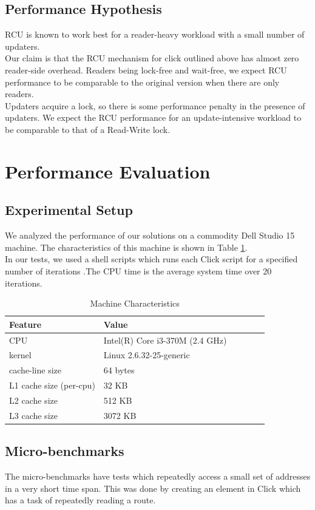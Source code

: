 \documentclass{article}
\begin{document}
\subsection{Performance Hypothesis}
RCU is known to work best for a reader-heavy workload with a small number of updaters.
\\Our claim is that the RCU mechanism for click outlined above has almost zero reader-side overhead. Readers being lock-free and wait-free, we expect RCU performance to be comparable to the original version when there are only readers.
\\Updaters acquire a lock, so there is some performance penalty in the presence of updaters. We expect the RCU performance for an update-intensive workload to be comparable to that of a Read-Write lock.
\section{Performance Evaluation}
\subsection{Experimental Setup}
We analyzed the performance of our solutions on a commodity Dell Studio 15 machine. The characteristics of this machine is shown in Table \ref{tbl:machine}.
\\In our tests, we used a shell scripts which runs each Click script for a specified number of iterations .The CPU time is the average system time over 20 iterations.
\begin{table}
\begin{center}
\begin{tabular}{|l|l|l|l|l|l|}
\hline Feature & Value\\
\hline CPU & Intel(R) Core  i3-370M (2.4 GHz)\\
\hline kernel & Linux 2.6.32-25-generic\\
\hline cache-line size & 64 bytes\\
\hline L1 cache size (per-cpu) & 32 KB\\
\hline L2 cache size & 512 KB\\
\hline L3 cache size & 3072 KB\\
\hline
\end{tabular}
\end{center}
\label{tbl:machine}
\caption{Machine Characteristics}
\end{table}

\subsection{Micro-benchmarks}
The micro-benchmarks have tests which repeatedly access a small set of addresses in a very short time span. This was done by creating an element in Click which has a task of repeatedly reading a route. 
\end{document}
